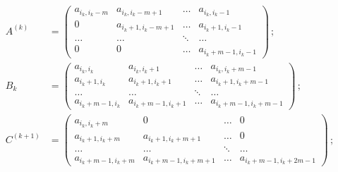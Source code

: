 \begin{align*}
A^{(k)} &=
\begin{pmatrix}
a_{i_k, i_k-m} & a_{i_k, i_k-m+1} & \ldots & a_{i_k, i_k-1}\\
0 & a_{i_k+1, i_k-m+1} & \ldots & a_{i_k+1, i_k-1}\\
\ldots &\ldots &\ddots&\ldots\\
0 & 0 & \ldots & a_{i_k+m-1,i_k-1}
\end{pmatrix}\,;\\
B_k & =
\begin{pmatrix}
a_{i_k, i_k} & a_{i_k, i_k+1} & \ldots & a_{i_k, i_k+m-1}\\
a_{i_k+1, i_k} & a_{i_k+1, i_k+1} & \ldots & a_{i_k+1, i_k+m-1}\\
\ldots &\ldots &\ddots&\ldots\\
a_{i_k+m-1, i_k}& a_{i_k+m-1,i_k+1} & \ldots & a_{i_k+m-1,i_k+m-1}
\end{pmatrix}\,;\\
C^{(k+1)} & =
\begin{pmatrix}
a_{i_k, i_k+m} & 0 & \ldots &0\\
a_{i_k+1,i_k+m} & a_{i_k+1, i_k+m+1} & \ldots & 0\\
\ldots &\ldots &\ddots&\ldots\\
a_{i_k+m-1,i_k+m} & a_{i_k+m-1,i_k+m+1} & \ldots & a_{i_k+m-1,i_k+2m-1}
\end{pmatrix}\,;
\end{align*}
